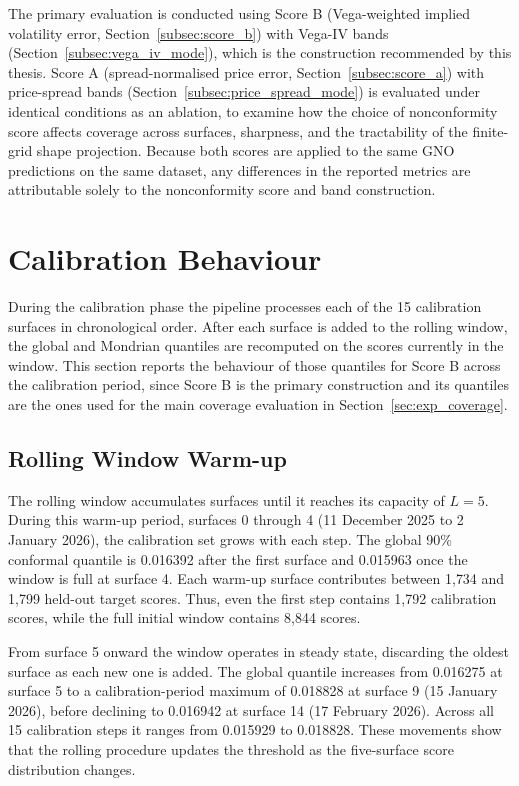 The primary evaluation is conducted using Score B (Vega-weighted implied volatility error, Section~\ref{subsec:score_b}) with Vega-IV bands (Section~\ref{subsec:vega_iv_mode}), which is the construction recommended by this thesis. Score A (spread-normalised price error, Section~\ref{subsec:score_a}) with price-spread bands (Section~\ref{subsec:price_spread_mode}) is evaluated under identical conditions as an ablation, to examine how the choice of nonconformity score affects coverage across surfaces, sharpness, and the tractability of the finite-grid shape projection. Because both scores are applied to the same GNO predictions on the same dataset, any differences in the reported metrics are attributable solely to the nonconformity score and band construction.

\section{Calibration Behaviour}
\label{sec:exp_calibration}

During the calibration phase the pipeline processes each of the 15 calibration surfaces in chronological order. After each surface is added to the rolling window, the global and Mondrian quantiles are recomputed on the scores currently in the window. This section reports the behaviour of those quantiles for Score B across the calibration period, since Score B is the primary construction and its quantiles are the ones used for the main coverage evaluation in Section~\ref{sec:exp_coverage}.

\subsection{Rolling Window Warm-up}
\label{subsec:exp_warmup}

The rolling window accumulates surfaces until it reaches its capacity of $L=5$. During this warm-up period, surfaces 0 through 4 (11 December 2025 to 2 January 2026), the calibration set grows with each step. The global 90\% conformal quantile is 0.016392 after the first surface and 0.015963 once the window is full at surface 4. Each warm-up surface contributes between 1{,}734 and 1{,}799 held-out target scores. Thus, even the first step contains 1{,}792 calibration scores, while the full initial window contains 8{,}844 scores.

From surface 5 onward the window operates in steady state, discarding the oldest surface as each new one is added. The global quantile increases from 0.016275 at surface 5 to a calibration-period maximum of 0.018828 at surface 9 (15 January 2026), before declining to 0.016942 at surface 14 (17 February 2026). Across all 15 calibration steps it ranges from 0.015929 to 0.018828. These movements show that the rolling procedure updates the threshold as the five-surface score distribution changes.

